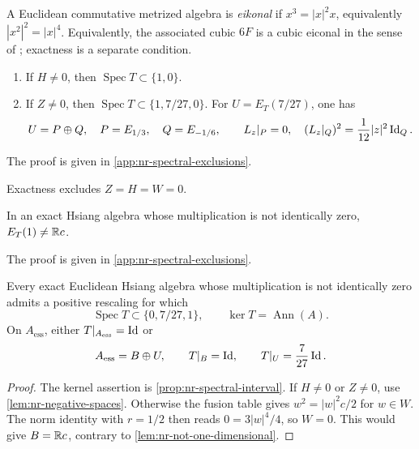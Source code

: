 A Euclidean commutative metrized algebra is \emph{eikonal} if
\(x^3=|x|^2x\), equivalently \(|x^2|^2=|x|^4\).
Equivalently, the associated cubic $6F$ is a cubic eiconal in the sense
of \cite[Definition~3.1.1]{NadirashviliTkachevVladut14}; exactness is a
separate condition.

\begin{lemma}\label{lem:nr-negative-spaces}
\begin{enumerate}[label=\textup{(\roman*)}]
\item If \(H\ne0\), then \(\operatorname{Spec}T\subset\{1,0\}\).
\item If \(Z\ne0\), then
\(\operatorname{Spec}T\subset\{1,7/27,0\}\).
For \(U=E_T(7/27)\), one has
\begin{equation}\label{eq:nr-U-peirce}
 U=P\oplus Q,\quad P=E_{1/3},\quad Q=E_{-1/6},\qquad
 L_z|_P=0,\quad (L_z|_Q)^2=\frac1{12}|z|^2\operatorname{Id}_Q.
\end{equation}
\end{enumerate}
\end{lemma}

The proof is given in \cref{app:nr-spectral-exclusions}.

Exactness excludes $Z=H=W=0$.

\begin{lemma}\label{lem:nr-not-one-dimensional}
In an exact Hsiang algebra whose multiplication is not identically zero,
\(E_T(1)\ne\mathbb R c\).
\end{lemma}

The proof is given in \cref{app:nr-spectral-exclusions}.

\begin{theorem}\label{thm:nonradial-spectral}
Every exact Euclidean Hsiang algebra whose multiplication is not
identically zero admits a positive rescaling for which
\begin{equation}\label{eq:nr-rigid-spectrum}
 \operatorname{Spec}T\subset\{0,7/27,1\},\qquad
 \ker T=\operatorname{Ann}(A).
\end{equation}
On $A_{\mathrm{ess}}$, either $T|_{A_{\mathrm{ess}}}=\operatorname{Id}$ or
\begin{equation}\label{eq:nr-quotient-splitting}
 A_{\mathrm{ess}}=B\oplus U,\qquad T|_B=\operatorname{Id},\qquad T|_U=\frac7{27}\operatorname{Id}.
\end{equation}
\end{theorem}

\begin{proof}
The kernel assertion is \cref{prop:nr-spectral-interval}.
If \(H\ne0\) or \(Z\ne0\), use
\cref{lem:nr-negative-spaces}.
Otherwise the fusion table gives \(w^2=|w|^2c/2\) for \(w\in W\).
The norm identity with \(r=1/2\) then reads
\(0=3|w|^4/4\), so \(W=0\). This would give
\(B=\mathbb R c\), contrary to \cref{lem:nr-not-one-dimensional}.
\end{proof}
